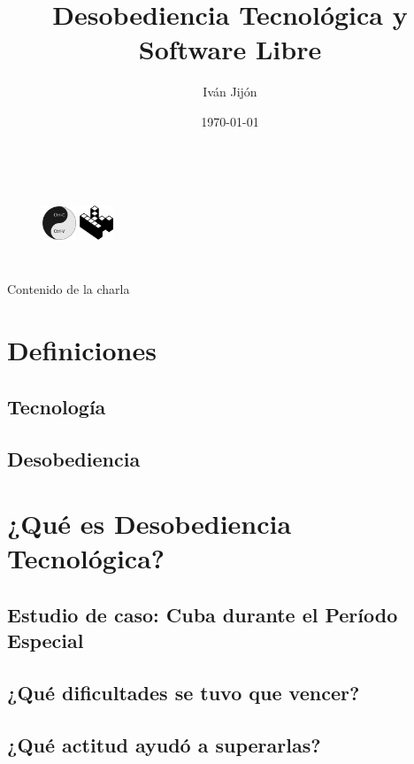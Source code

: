\documentclass[spanish]{beamer}
\title{Desobediencia Tecnológica y Software Libre}
\author{Iván Jijón}
\institute{ FLISoL 2023, Quito - Ecuador}
\date{\today}
\begin{document}
\begin{frame}
    \titlepage
    \begin{columns}
            \begin{figure}
                \href{https://kopimi.com/}{\includegraphics[width=1cm]{img/Kopimizm.jpg}}
                \href{https://kopimi.com/}{\includegraphics[width=1cm]{img/Kopimi_k.png}}
            \end{figure}
    \end{columns}
\end{frame}


\begin{frame}{Contenido de la charla}
    \tableofcontents
\end{frame}

\section{Definiciones}
    \subsection{Tecnología}
    \subsection{Desobediencia}
\section{¿Qué es \textbf{Desobediencia Tecnológica}?}
    \subsection{Estudio de caso: Cuba durante el Período Especial}
    \subsection{¿Qué \textbf{dificultades} se tuvo que vencer?}
    \subsection{¿Qué actitud ayudó a \textbf{superarlas}?}
\end{document}

